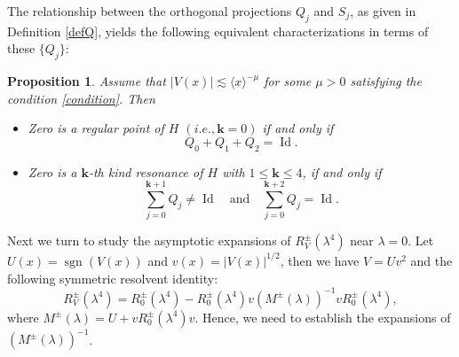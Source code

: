 \documentclass[reqno]{amsart}
\newtheorem{proposition}[theorem]{Proposition}
\def\Id{\mathop{\mathrm{Id}}\nolimits}
\numberwithin{equation}{section}
\begin{document}
The relationship between the orthogonal projections $Q_j$ and $S_j$, as given in Definition \ref{defQ}, yields the following equivalent characterizations in terms of these $\{Q_j\}$:

\begin{proposition}\label{characterizations Q}
	Assume that $|V(x)| \lesssim \langle x \rangle^{-\mu}$ for some $\mu > 0$ satisfying the condition \eqref{condition}. Then
	\begin{itemize}
		\item[(i)] Zero is a regular point of $H$ $(i.e., \mathbf{k} = 0) $ if and only if
		\[
		Q_0 + Q_1 + Q_2 = \Id.
		\]
		\item[(ii)]  Zero is a $\mathbf{k}$-th kind resonance of $H$ with $1 \le \mathbf{k} \le 4$, if and only if
		\[
		\sum_{j=0}^{\mathbf{k}+1} Q_j \neq \Id \quad \text{and} \quad \sum_{j=0}^{\mathbf{k}+2} Q_j = \Id.
		\]
	\end{itemize}
\end{proposition}
Next we turn to study the asymptotic expansions of $R^\pm_V(\lambda^4)$ near $\lambda=0.$
Let $U(x)=\operatorname{sgn}(V(x))$ and $v(x)=|V(x)|^{1/2}$, then we have $ V=Uv^2$ and
the following symmetric resolvent identity:
 \begin{equation}\label{id-RV}
R^\pm_V(\lambda^4) = R_0^\pm(\lambda^4) -R^\pm_0(\lambda^4)v(M^\pm(\lambda))^{-1}vR^\pm_0(\lambda^4),
\end{equation}
where $M^{\pm}(\lambda)=U+ vR^\pm_0(\lambda^4)v$. Hence, we need to establish the expansions of
$(M^\pm(\lambda))^{-1}$.
\end{document}
